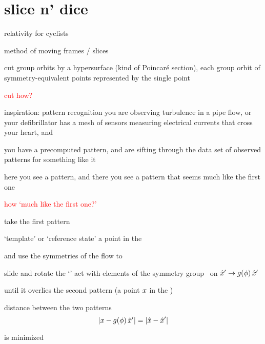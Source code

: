 \section[slice n' dice]{slice n' dice}


\begin{frame}{relativity for cyclists}
\begin{block}{method of moving frames / slices}

\bigskip
cut group orbits by a hypersurface (kind of
Poincar\'e section), each group orbit of
symmetry-equivalent points represented by the single point
\end{block}
\bigskip
\textcolor{red}{\Large cut how?}
\end{frame}


\begin{frame}{inspiration: pattern recognition}
you are observing turbulence in a pipe flow, or your defibrillator has a
mesh of sensors measuring electrical currents that cross your heart, and

\medskip

you have a precomputed pattern, and are sifting through the data set of
observed patterns for something like it

\medskip

here you see a pattern, and there you see a pattern that seems much like
the first one

\bigskip

\bigskip

\textcolor{red}{\Large how `much like the first one?'}
\end{frame}

\begin{frame}{}
take the first pattern
\begin{block}{`template' or `reference state'}
\hfill  a point {\slicep} in the \statesp\  \pS
\end{block}

and use the symmetries of the flow to
\begin{block}{slide and rotate the `{\template}'}
\hfill  act with elements of the symmetry group \Group\ on
${\hat{x}'} \to g({\bf \phi})\,{\hat{x}'}$
\end{block}
 until it overlies the second pattern (a point $x$ in
the \statesp)
\begin{block}{distance between the two patterns}
\[ %
|\ssp - \LieEl(\gSpace)\,\slicep|
    = |\sspRed - \slicep|
\] %
\end{block}
is minimized
\end{frame}

